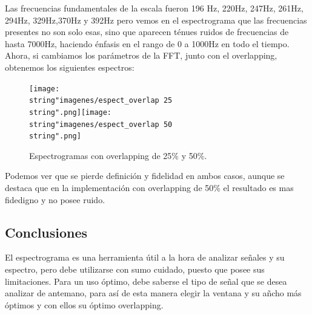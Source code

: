 \documentclass[../ASSD_TP2.tex]{subfiles}
\begin{document}
Las frecuencias fundamentales de la escala fueron 196 Hz, 220Hz, 247Hz,
261Hz, 294Hz, 329Hz,370Hz y 392Hz pero vemos en el espectrograma que
las frecuencias presentes no son solo esas, sino que aparecen ténues
ruidos de frecuencias de hasta 7000Hz, haciendo énfasis en el rango
de 0 a 1000Hz en todo el tiempo. Ahora, si cambiamos los parámetros
de la FFT, junto con el overlapping, obtenemos los siguientes espectros:

\begin{figure}[H]

\centering{}\texttt{[image: \\string"imagenes/espect\_overlap 25\\string".png]}\texttt{[image: \\string"imagenes/espect\_overlap 50\\string".png]}\caption{Espectrogramas con overlapping de 25\% y 50\%.}
\end{figure}

Podemos ver que se pierde definición y fidelidad en ambos casos, aunque
se destaca que en la implementación con overlapping de 50\% el resultado
es mas fidedigno y no posee ruido.

\subsection{Conclusiones}

El espectrograma es una herramienta útil a la hora de analizar señales
y su espectro, pero debe utilizarse con sumo cuidado, puesto que posee
sus limitaciones. Para un uso óptimo, debe saberse el tipo de señal
que se desea analizar de antemano, para así de esta manera elegir
la ventana y su añcho más óptimos y con ellos su óptimo overlapping.
\end{document}
